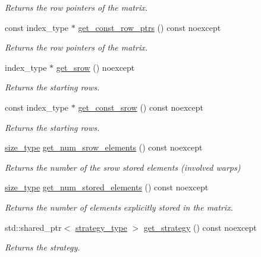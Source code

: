 \begin{DoxyCompactItemize}
\begin{DoxyCompactList}\small\item\em Returns the row pointers of the matrix. \end{DoxyCompactList}\item 
const index\+\_\+type $\ast$ \hyperlink{classgko_1_1matrix_1_1Csr_a50c9ce521649450d7ae5ff488e42c190}{get\+\_\+const\+\_\+row\+\_\+ptrs} () const noexcept
\begin{DoxyCompactList}\small\item\em Returns the row pointers of the matrix. \end{DoxyCompactList}\item 
index\+\_\+type $\ast$ \hyperlink{classgko_1_1matrix_1_1Csr_a919fb1efdcbde6fba7eb18bdc39ba46a}{get\+\_\+srow} () noexcept
\begin{DoxyCompactList}\small\item\em Returns the starting rows. \end{DoxyCompactList}\item 
const index\+\_\+type $\ast$ \hyperlink{classgko_1_1matrix_1_1Csr_ac046f27c47848bf31c9234567661ef48}{get\+\_\+const\+\_\+srow} () const noexcept
\begin{DoxyCompactList}\small\item\em Returns the starting rows. \end{DoxyCompactList}\item 
\hyperlink{namespacegko_a6e5c95df0ae4e47aab2f604a22d98ee7}{size\+\_\+type} \hyperlink{classgko_1_1matrix_1_1Csr_a5b8c25c2fb1bbea62a3afdec8f8340c5}{get\+\_\+num\+\_\+srow\+\_\+elements} () const noexcept
\begin{DoxyCompactList}\small\item\em Returns the number of the srow stored elements (involved warps) \end{DoxyCompactList}\item 
\hyperlink{namespacegko_a6e5c95df0ae4e47aab2f604a22d98ee7}{size\+\_\+type} \hyperlink{classgko_1_1matrix_1_1Csr_ab70c085fc3df11a4ed9fe74b40844c5c}{get\+\_\+num\+\_\+stored\+\_\+elements} () const noexcept
\begin{DoxyCompactList}\small\item\em Returns the number of elements explicitly stored in the matrix. \end{DoxyCompactList}\item 
std\+::shared\+\_\+ptr$<$ \hyperlink{classgko_1_1matrix_1_1Csr_1_1strategy__type}{strategy\+\_\+type} $>$ \hyperlink{classgko_1_1matrix_1_1Csr_ada0db14e65dfe027f483dc449f704a7e}{get\+\_\+strategy} () const noexcept
\begin{DoxyCompactList}\small\item\em Returns the strategy. \end{DoxyCompactList}\end{DoxyCompactItemize}
